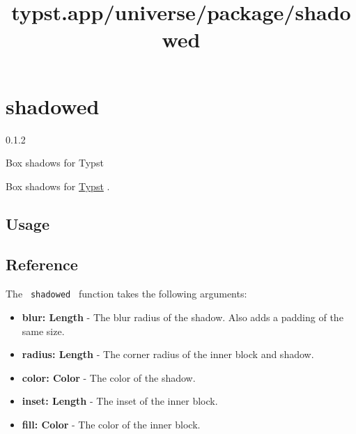 \title{typst.app/universe/package/shadowed}

\label{banner}
\section{shadowed}\label{shadowed}

{ 0.1.2 }

Box shadows for Typst

\label{readme}
Box shadows for \href{https://typst.app/}{Typst} .

\subsection{Usage}\label{usage}

\begin{Shaded}
\begin{Highlighting}[]


\NormalTok{\#shadowed(radius: 4pt, inset: 12pt)[}
\NormalTok{]}
\end{Highlighting}
\end{Shaded}


\subsection{Reference}\label{reference}

The \texttt{\ shadowed\ } function takes the following arguments:

\begin{itemize}
\tightlist
\item
  \textbf{blur: Length} - The blur radius of the shadow. Also adds a
  padding of the same size.
\item
  \textbf{radius: Length} - The corner radius of the inner block and
  shadow.
\item
  \textbf{color: Color} - The color of the shadow.
\item
  \textbf{inset: Length} - The inset of the inner block.
\item
  \textbf{fill: Color} - The color of the inner block.
\end{itemize}

